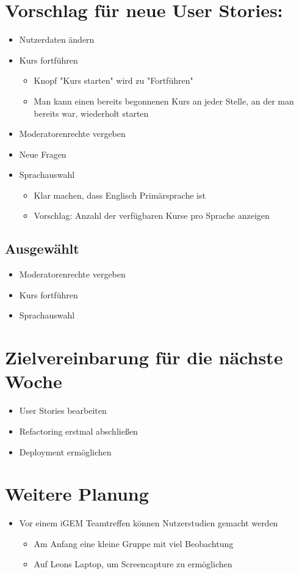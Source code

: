 \documentclass[colorback, accentcolor=tud1c, paper=a4]{tudexercise}
\begin{document}
\begin{multicols}{2}
\section{Vorschlag für neue User Stories:}
\begin{itemize}
\item Nutzerdaten ändern
\item Kurs fortführen
	\begin{itemize}
	\item Knopf "Kurs starten" wird zu "Fortführen"
	\item Man kann einen bereits begonnenen Kurs an jeder Stelle, an der man bereits war, wiederholt starten
	\end{itemize}
\item Moderatorenrechte vergeben
\item Neue Fragen
\item Sprachauswahl
	\begin{itemize}
	\item Klar machen, dass Englisch Primärsprache ist
	\item Vorschlag: Anzahl der verfügbaren Kurse pro Sprache anzeigen
	\end{itemize}
\end{itemize}

\subsection{Ausgewählt}
\begin{itemize}
\item Moderatorenrechte vergeben
\item Kurs fortführen
\item Sprachauswahl
\end{itemize}

\section{Zielvereinbarung für die nächste Woche}
\begin{itemize}
\item User Stories bearbeiten
\item Refactoring erstmal abschließen
\item Deployment ermöglichen
\end{itemize}

\section{Weitere Planung}
\begin{itemize}
\item Vor einem iGEM Teamtreffen können Nutzerstudien gemacht werden
	\begin{itemize}
	\item Am Anfang eine kleine Gruppe mit viel Beobachtung
	\item Auf Leons Laptop, um Screencapture zu ermöglichen
	\end{itemize}
\end{itemize}
\end{multicols}
\end{document}

